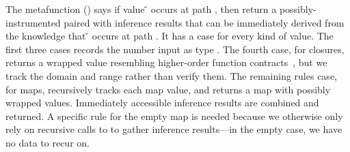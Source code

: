 The metafunction \trackmeta{\v{}}{\inferpath{}}{\vp{}}{\res{}} ()
says if value \v{} occurs at path {\inferpath{}}, then return a possibly-instrumented
\vp{} paired with inference results {\res{}} that can be immediately derived
from the knowledge that \v{} occurs at path {\inferpath{}}.
It has a case for every kind of value.
The first three cases records the number input as type {\IntT{}}.
The fourth case, for closures, returns a wrapped value
resembling higher-order function contracts~\cite{findler2002contracts},
but we track the domain and range rather than verify them.
The remaining rules case, for maps, recursively tracks each map value,
and returns a map with possibly wrapped values.
Immediately accessible inference results are combined
and returned.
A specific rule for the empty map is needed because we otherwise only rely on
recursive calls to \trackEOp{} to gather inference results---in the empty case,
we have no data to recur on.

